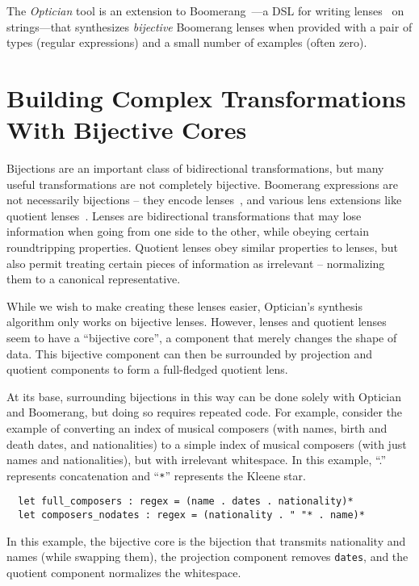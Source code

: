 \documentclass[a4paper]{article}
\begin{document}
The {\em Optician} tool is an extension to Boomerang~\cite{boomerang}---a
DSL for writing lenses~\cite{Focal2005-long2} on strings---that synthesizes
{\em bijective} Boomerang lenses when provided with a pair of types (regular
expressions) and a small number of examples (often zero).

\section{Building Complex Transformations With Bijective Cores}

Bijections are an important class of bidirectional transformations, but many
useful transformations are not completely bijective. Boomerang expressions are
not necessarily bijections -- they encode lenses~\cite{Focal2005-long2}, and
various lens extensions like quotient lenses~\cite{quotientlenses}. Lenses are
bidirectional transformations that may lose information when going from one side
to the other, while obeying certain roundtripping properties. Quotient lenses
obey similar properties to lenses, but also permit treating certain pieces of
information as irrelevant -- normalizing them to a canonical representative.

While we wish to make creating these lenses easier, Optician's synthesis algorithm
only works on bijective lenses. However, lenses and quotient lenses seem to have
a ``bijective core'', a component that merely changes the shape of data.
This bijective component can then be surrounded by projection and quotient
components to form a full-fledged quotient lens.

At its base, surrounding bijections in this way can be done solely with Optician
and Boomerang, but doing so requires repeated code. For example, consider the
example of converting an index of musical composers (with names, birth and death
dates, and nationalities) to a simple index of musical composers (with just
names and nationalities), but with irrelevant whitespace. In this example, ``.''
represents concatenation and ``\lstinline{*}'' represents the Kleene star.

\begin{lstlisting}
  let full_composers : regex = (name . dates . nationality)*
  let composers_nodates : regex = (nationality . " "* . name)*
\end{lstlisting}

In this example, the bijective core is the bijection that transmits nationality and
names (while swapping them), the projection component removes \lstinline{dates},
and the quotient component normalizes the whitespace.
\end{document}
